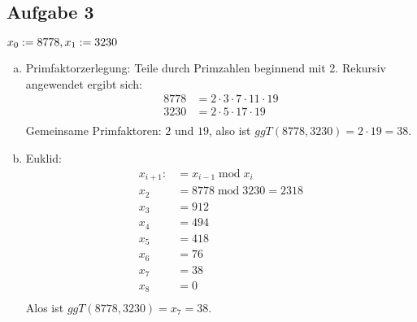 \subsection*{Aufgabe 3}
$x_0 := 8778, x_1 := 3230 \\$
\begin{enumerate}[a)]
  \item Primfaktorzerlegung:
  Teile durch Primzahlen beginnend mit 2. Rekursiv angewendet ergibt sich:
\begin{align*}
8778 &= 2 \cdot 3 \cdot 7 \cdot 11 \cdot 19 \\
3230 &= 2 \cdot 5 \cdot 17 \cdot 19 \\
\end{align*}
Gemeinsame Primfaktoren: $2$ und $19$, also ist $ggT(8778, 3230) = 2 \cdot 19 = 38$.
  \item Euklid:
\begin{align*}
x_{i+1} :&= x_{i-1} \; \text{mod} \; x_i \\
x_2 &= 8778 \; \text{mod} \; 3230 = 2318 \\
x_3 &= 912 \\
x_4 &= 494 \\
x_5 &= 418 \\
x_6 &= 76 \\
x_7 &= 38 \\
x_8 &= 0 \\
\end{align*}
Alos ist $ggT(8778, 3230) = x_7 = 38$.
\end{enumerate}


